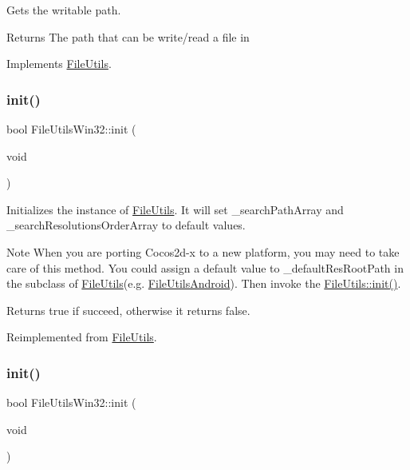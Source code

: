 Gets the writable path. \begin{DoxyReturn}{Returns}
The path that can be write/read a file in 
\end{DoxyReturn}


Implements \hyperlink{classFileUtils_aab14c8d4e292f7a1e9b2b2908d02a0ed}{File\+Utils}.

\mbox{\label{classFileUtilsWin32_a686cc28ad94c2c904c857cb2808b36d4}} 
\subsubsection{\texorpdfstring{init()}{init()}\hspace{0.1cm}{\footnotesize\ttfamily [1/2]}}
{\footnotesize\ttfamily bool File\+Utils\+Win32\+::init (\begin{DoxyParamCaption}\item[{void}]{ }\end{DoxyParamCaption})\hspace{0.3cm}{\ttfamily [virtual]}}

Initializes the instance of \hyperlink{classFileUtils}{File\+Utils}. It will set \+\_\+search\+Path\+Array and \+\_\+search\+Resolutions\+Order\+Array to default values.

\begin{DoxyNote}{Note}
When you are porting Cocos2d-\/x to a new platform, you may need to take care of this method. You could assign a default value to \+\_\+default\+Res\+Root\+Path in the subclass of \hyperlink{classFileUtils}{File\+Utils}(e.\+g. \hyperlink{classFileUtilsAndroid}{File\+Utils\+Android}). Then invoke the \hyperlink{classFileUtils_a2c891e99dc7af7343f4f9e8d4798a563}{File\+Utils\+::init()}. 
\end{DoxyNote}
\begin{DoxyReturn}{Returns}
true if succeed, otherwise it returns false. 
\end{DoxyReturn}


Reimplemented from \hyperlink{classFileUtils_a2c891e99dc7af7343f4f9e8d4798a563}{File\+Utils}.

\mbox{\label{classFileUtilsWin32_a686cc28ad94c2c904c857cb2808b36d4}} 
\subsubsection{\texorpdfstring{init()}{init()}\hspace{0.1cm}{\footnotesize\ttfamily [2/2]}}
{\footnotesize\ttfamily bool File\+Utils\+Win32\+::init (\begin{DoxyParamCaption}\item[{void}]{ }\end{DoxyParamCaption})\hspace{0.3cm}{\ttfamily [virtual]}}

